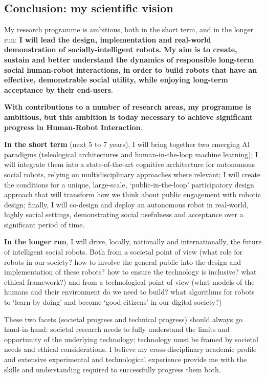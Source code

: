 \subsection{Conclusion: my scientific vision}

My research programme is ambitious, both in the short term, and in the longer
run: \textbf{I will lead the design, implementation and real-world demonstration
of socially-intelligent robots. My aim is to create, sustain and better
understand the dynamics of responsible long-term social human-robot
interactions, in order to build robots that have an effective, demonstrable
social utility, while enjoying long-term acceptance by their end-users}.

\vspace{1em}

\textbf{With contributions to a number of research areas, my programme is ambitious, but
this ambition is today necessary to achieve significant progress in Human-Robot
Interaction}.

\vspace{1em}

\textbf{In the short term} (next 5 to 7 years), I will bring together two emerging AI
paradigms (teleological architectures and human-in-the-loop machine learning); I
will integrate them into a state-of-the-art cognitive architecture for
autonomous social robots, relying on multidisciplinary approaches where
relevant; I will create the conditions for a unique, large-scale,
`public-in-the-loop' participatory design approach that will transform how we
think about public engagement with robotic design; finally, I will co-design
and deploy an autonomous robot in real-world, highly social settings,
demonstrating social usefulness and acceptance over a significant period of
time.

\textbf{In the longer run}, I will drive, locally, nationally and internationally, the
future of intelligent social robots. Both from a societal point of view (what
role for robots in our society? how to involve the general public into the
design and implementation of these robots?  how to ensure the technology is
inclusive? what ethical framework?) and from a technological point of view (what
models of the humans and their environment do we need to build? what algorithms
for robots to `learn by doing' and become `good citizens' in our digital
society?)

These two facets (societal progress and technical progress) should always go
hand-in-hand: societal research needs to fully understand the limits and
opportunity of the underlying technology; technology must be framed
by societal needs and ethical considerations. I believe my cross-disciplinary
academic profile and extensive experimental and technological experience provide me
with the skills and understanding required to successfully progress them both.


